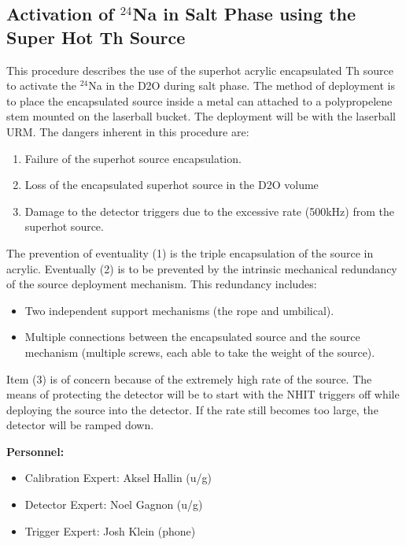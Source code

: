 
\subsection{Activation of $^{24}$Na in 
            Salt Phase using the Super Hot Th Source}
 
 

 

 This procedure describes the use of the superhot acrylic encapsulated
Th source to activate the $^{24}$Na in the D2O during salt phase.  The method
of deployment is to place the encapsulated source inside a metal can
attached to a polypropelene stem mounted on the laserball bucket.
The deployment will be with the laserball URM.
The dangers
inherent in this procedure are:
\begin{enumerate}  
\item Failure of the superhot source encapsulation.
\item Loss of the encapsulated superhot source in the D2O volume
\item Damage to the detector triggers due to the excessive rate
     (500kHz) from the superhot source.
\end{enumerate}
The prevention of eventuality (1) is the triple encapsulation of
the source in acrylic.  Eventually (2) is to be prevented by
the intrinsic mechanical redundancy of the source deployment
mechanism.  This redundancy includes:
\begin{itemize}
\item Two independent support mechanisms (the rope and umbilical).
\item Multiple connections between the encapsulated source and the
  source mechanism (multiple screws, each able to take the weight of
  the source).
\end{itemize}
Item (3) is of concern because of the extremely high rate of the
source.  The means of protecting the detector will be to start with
the NHIT triggers off while deploying the source into the detector.
If the rate still becomes too large, the detector will be ramped
down.
 
\noindent
{\bf Personnel:}
\begin{itemize}
\item Calibration Expert:  Aksel Hallin (u/g)
\item Detector Expert: Noel Gagnon (u/g)
\item Trigger Expert: Josh Klein (phone)
\end{itemize}

